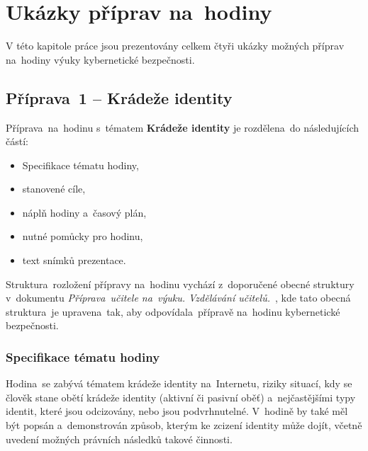 \documentclass[a4paper, 12pt]{article}
\begin{document}


\newpage
\section{Ukázky příprav na~hodiny}
V této kapitole práce jsou prezentovány celkem čtyři ukázky možných příprav na~hodiny výuky kybernetické bezpečnosti.

\subsection{Příprava~1 -- Krádeže identity}
Příprava~na~hodinu s~tématem \textbf{Krádeže identity} je rozdělena~do následujících částí:
    \begin{itemize}
        \setlength{\itemsep}{-3pt}
        \item Specifikace tématu hodiny,
        \item stanovené cíle,
        \item náplň hodiny a~časový plán,
        \item nutné pomůcky pro hodinu,
        \item text snímků prezentace.
    \end{itemize}

Struktura~rozložení přípravy na~hodinu vychází z~doporučené obecné struktury v~dokumentu \textit{Příprava~učitele na~výuku. Vzdělávání učitelů.}~\cite{presentationPavlaZ}, kde tato obecná struktura~je upravena~tak, aby odpovídala~přípravě na~hodinu kybernetické bezpečnosti.

\subsubsection{Specifikace tématu hodiny}
Hodina~se zabývá tématem krádeže identity na~Internetu, riziky situací, kdy se člověk stane obětí krádeže identity (aktivní či pasivní oběť) a~nejčastějšími typy identit, které jsou odcizovány, nebo jsou podvrhnutelné. V~hodině by také měl být popsán a~demonstrován způsob, kterým ke zcizení identity může dojít, včetně uvedení možných právních následků takové činnosti.
\end{document}
